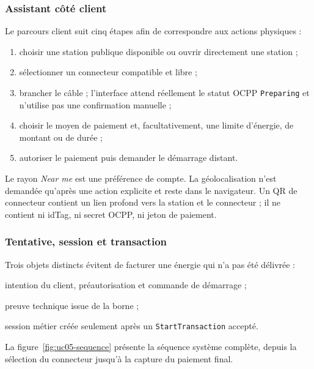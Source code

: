 \subsubsection{Assistant côté client}

Le parcours client suit cinq étapes afin de correspondre aux actions physiques :

\begin{enumerate}[leftmargin=8mm]
  \item choisir une station publique disponible ou ouvrir directement une station ;
  \item sélectionner un connecteur compatible et libre ;
  \item brancher le câble ; l'interface attend réellement le statut OCPP
  \texttt{Preparing} et n'utilise pas une confirmation manuelle ;
  \item choisir le moyen de paiement et, facultativement, une limite d'énergie, de
  montant ou de durée ;
  \item autoriser le paiement puis demander le démarrage distant.
\end{enumerate}

Le rayon \emph{Near me} est une préférence de compte. La géolocalisation n'est
demandée qu'après une action explicite et reste dans le navigateur. Un QR de
connecteur contient un lien profond vers la station et le connecteur ; il ne
contient ni idTag, ni secret OCPP, ni jeton de paiement.

\subsubsection{Tentative, session et transaction}

Trois objets distincts évitent de facturer une énergie qui n'a pas été délivrée :

\begin{description}[leftmargin=34mm,style=nextline]
  \item[\texttt{ChargingAttempt}] intention du client, préautorisation et commande de
  démarrage ;
  \item[\texttt{OcppTransaction}] preuve technique issue de la borne ;
  \item[\texttt{ChargingSession}] session métier créée seulement après un
  \texttt{StartTransaction} accepté.
\end{description}

La figure~\ref{fig:uc05-sequence} présente la séquence système complète, depuis la
sélection du connecteur jusqu'à la capture du paiement final.

